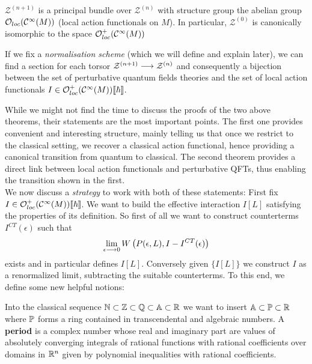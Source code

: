 \begin{theo}
  $\mathcal{Z}^{(n+1)}$ is a principal bundle over $\mathcal{Z}^{(n)}$ with structure group the abelian group $\mathcal{O}_{loc}(\mathcal{C}^{\infty}(M))$ (local action functionals on $M$). In particular, $\mathcal{Z}^{(0)}$ is canonically isomorphic to the space $\mathcal{O}^+_{loc}(\mathcal{C}^{\infty}(M))$
\end{theo}

\begin{theo}
  If we fix a \emph{normalisation scheme} (which we will define and explain later), we can find a section for each torsor $\mathcal{Z}^{(n+1)} \longrightarrow \mathcal{Z}^{(n)}$ and consequently a bijection between the set of perturbative quantum fields theories and the set of local action functionals $I \in \mathcal{O}^+_{loc}(\mathcal{C}^{\infty}(M))\llbracket \hbar \rrbracket$.
\end{theo}

While we might not find the time to discuss the proofs of the two above theorems, their statements are the most important points. The first one provides convenient and interesting structure, mainly telling us that once we restrict to the classical setting, we recover a classical action functional, hence providing a canonical transition from quantum to classical. The second theorem provides a direct link between local action functionals and perturbative QFTs, thus enabling the transition shown in the first.\\

We now discuss a \textit{strategy} to work with both of these statements: First fix $I \in \mathcal{O}^+_{loc}(\mathcal{C}^{\infty}(M))\llbracket \hbar \rrbracket$. We want to build the effective interaction $I[L]$ satisfying the properties of its definition. So first of all we want to construct counterterms $I^{CT}(\epsilon)$ such that
$$ \lim_{\epsilon \lra 0} W\left(P(\epsilon,L), I-I^{CT}(\epsilon)\right)$$
exists and in particular defines $I[L]$. Conversely given $\{I[L]\}$ we construct $I$ as a renormalized limit, subtracting the suitable counterterms. To this end, we define some new helpful notions:

\begin{definition}[Periods]
  Into the classical sequence $\mathbb{N} \subset \mathbb{Z} \subset \mathbb{Q} \subset \mathbb{A} \subset \mathbb{R}$ we want to insert $\mathbb{A} \subset \mathbb{P} \subset \mathbb{R}$ where $\mathbb{P}$ forms a ring contained in transcendental and algebraic numbers. A \textbf{period} is a complex number whose real and imaginary part are values of absolutely converging integrals of rational functions with rational coefficients over domains in $\mathbb{R}^n$ given by polynomial inequalities with rational coefficients.
\end{definition}

